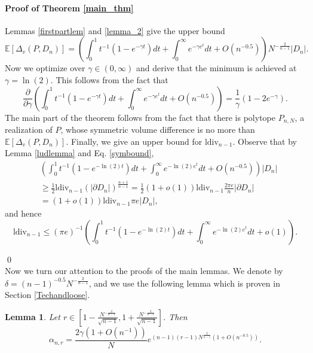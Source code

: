 \documentclass[10pt, twoside, leqno]{article}
\newtheorem{lemma}[thm]{Lemma}
\theoremstyle{definition}
\numberwithin{equation}{section}
\newcommand{\E}{{\mathbb{E}}}
\newcommand{\NN}{N^{-\frac 2{n-1} }}
\begin{document}
\paragraph{Proof of Theorem \ref{main_thm}}
 Lemmas \ref{firstpartlem} and \ref{lemma_2} give the  upper bound 
\begin{equation}\label{symbound}
\E[\Delta_v(P,D_n)] =  \left(\int_{0}^{1} t^{-1}(1-e^{-\gamma t})dt + \int_{0}^{\infty}e^{-\gamma e^{t}}dt + O(n^{-0.5})\right)\NN|D_n|.
\end{equation}
Now we optimize over $ \gamma \in (0,\infty) $ and derive that the minimum is achieved at $ \gamma = \ln(2).$ This follows from the fact that
\begin{equation*}
\frac{\partial}{\partial\gamma}\left(\int_{0}^{1} t^{-1}(1-e^{-\gamma t})dt + \int_{0}^{\infty}e^{-\gamma e^{t}}dt + O(n^{-0.5})\right)=
\frac{1}{\gamma}(1-2e^{-\gamma}).
\end{equation*}
The main part of the theorem follows from the fact that there is polytope $ P_{n,N} $, a realization of $ P $, whose symmetric volume difference is no more than $\E[\Delta_v(P,D_n)] $. Finally, we give an upper bound for $ \text{ldiv}_{n-1} $. Observe that by Lemma \ref{ludlemma} and  Eq. \eqref{symbound},%
\begin{align*} & \left(\int_{0}^{1}t^{-1}(1-e^{-\ln(2)t})dt+\int_{0}^{\infty}e^{-\ln(2)e^{t}}dt+O(n^{-0.5})\right)|D_{n}|\\
& \geq\frac{1}{2}\textrm{ldiv}_{n-1}\left(|\partial D_{n}|\right)^{\frac{n+1}{n-1}}=\frac{1}{2}(1+o(1))\textrm{ldiv}_{n-1}\frac{2\pi e}{n}|\partial D_{n}|\\
& =(1+o(1))\textrm{ldiv}_{n-1}\pi e|D_{n}|,
\end{align*}
and hence
\[
\text{ldiv}_{n-1} \leq (\pi e)^{-1}\left(\int_{0}^{1} t^{-1}(1-e^{-\ln(2)t})dt + \int_{0}^{\infty}e^{-\ln(2)e^{t}}dt+o(1)\right).
\]

\qed
\\

Now we turn our attention to the proofs of the main lemmas. We denote by $\delta = \left(n-1\right)^{-0.5}N^{-\frac{2}{n-1}}$, and we  use the following lemma which is proven in Section \ref{Techandloose}.
\begin{lemma}{\label{main_lemma}}
Let $ r \in [1-\frac{\NN}{\sqrt{n-1}}, 1+\frac{\NN}{\sqrt{n-1}}]$. Then%
\begin{equation}
\alpha_{n,r}=\frac{2\gamma\left(1+O\left(n^{-1}\right)\right)}{N}e^{\left(n-1\right)\left(r-1\right)N^{\frac{2}{n-1}}\left(1+O\left(n^{-0.5}\right)\right)}.
\end{equation}
\end{lemma} 
\end{document}
